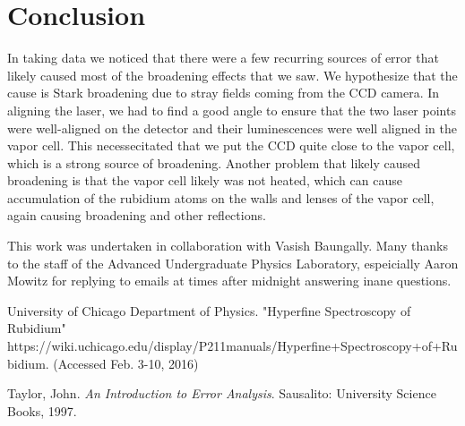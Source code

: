 \documentclass{article}
\begin{document}
\section{Conclusion}
  In taking data we noticed that there were a few recurring sources of error that likely caused most of the broadening effects that we saw.  We hypothesize that the cause is Stark broadening due to stray fields coming from the CCD camera.  In aligning the laser, we had to find a good angle to ensure that the two laser points were well-aligned on the detector and their luminescences were well aligned in the vapor cell.  This necessecitated that we put the CCD quite close to the vapor cell, which is a strong source of broadening.  Another problem that likely caused broadening is that the vapor cell likely was not heated, which can cause accumulation of the rubidium atoms on the walls and lenses of the vapor cell, again causing broadening and other reflections.

  \hspace{.25cm}

  This work was undertaken in collaboration with Vasish Baungally.  Many thanks to the staff of the Advanced Undergraduate Physics Laboratory, espeicially Aaron Mowitz for replying to emails at times after midnight answering inane questions.

  \begin{thebibliography}{10}
    	University of Chicago Department of Physics. "Hyperfine Spectroscopy of Rubidium"\\
    	https://wiki.uchicago.edu/display/P211manuals/Hyperfine+Spectroscopy+of+Rubidium. (Accessed Feb. 3-10, 2016)

    	Taylor, John. \emph{An Introduction to Error Analysis}. Sausalito: University Science Books, 1997.
  \end{thebibliography}
\end{document}

